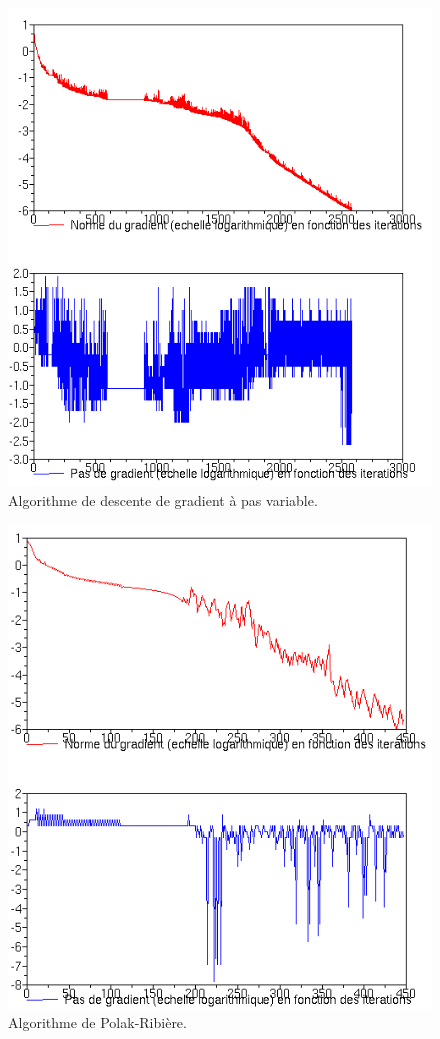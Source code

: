 \documentclass[11pt]{article}
\begin{document}
\begin{figure}[H]
  \centering
    \includegraphics[width=0.95 \textwidth]{Images/gradw.png}
  \caption{Algorithme de descente de gradient à pas variable.}
\end{figure}
\begin{figure}[H]
  \centering
    \includegraphics[width=0.95 \textwidth]{Images/Polak.png}
  \caption{Algorithme de Polak-Ribière.}
\end{figure}
\end{document}
